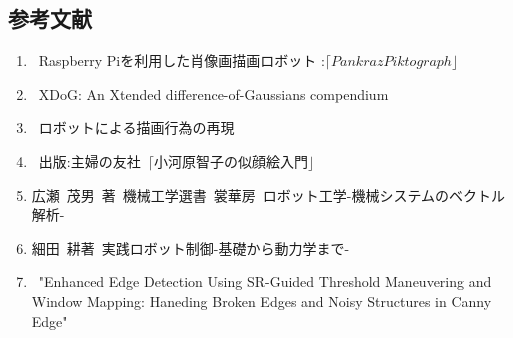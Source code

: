 \documentclass[a4j]{jarticle}			%
\begin{document}
\begin{multicols}{2}
\section{参考文献}

\begin{enumerate}
\item {}\rbrack \ Raspberry Piを利用した肖像画描画ロボット :$ \lceil Pankraz Piktograph \rfloor$ 
\item {}\rbrack \ XDoG: An Xtended difference-of-Gaussians compendium
\item {}\rbrack \ ロボットによる描画行為の再現
\item {}\rbrack \ 出版:主婦の友社\ $\lceil \text{小河原智子の似顔絵入門} \rfloor$
\item 広瀬\ 茂男\ 著\ 機械工学選書\ 裳華房\ ロボット工学-機械システムのベクトル解析-
\item 細田\ 耕著\ 実践ロボット制御-基礎から動力学まで-
\item \ "Enhanced Edge Detection Using SR-Guided Threshold Maneuvering and Window Mapping: Haneding Broken Edges and Noisy Structures in Canny Edge"
\end{enumerate}

\end{multicols}
\end{document}
